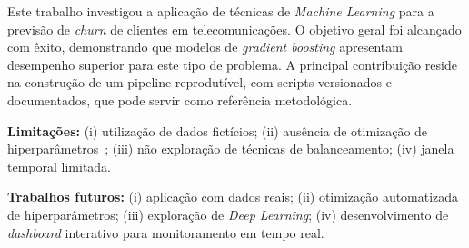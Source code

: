 \documentclass[
    article,
    12pt,
    oneside,
    a4paper,
    english,
    brazilian
    ]{abntex2}
\numberwithin{equation}{section}
\begin{document}
Este trabalho investigou a aplicação de técnicas de \textit{Machine Learning} para a previsão de \textit{churn} de clientes em telecomunicações. O objetivo geral foi alcançado com êxito, demonstrando que modelos de \textit{gradient boosting} apresentam desempenho superior para este tipo de problema. A principal contribuição reside na construção de um pipeline reprodutível, com scripts versionados e documentados, que pode servir como referência metodológica.

\textbf{Limitações:} (i) utilização de dados fictícios; (ii) ausência de otimização de hiperparâmetros~\cite{machado2023}; (iii) não exploração de técnicas de balanceamento; (iv) janela temporal limitada.

\textbf{Trabalhos futuros:} (i) aplicação com dados reais; (ii) otimização automatizada de hiperparâmetros; (iii) exploração de \textit{Deep Learning}; (iv) desenvolvimento de \textit{dashboard} interativo para monitoramento em tempo real.



\end{document}
